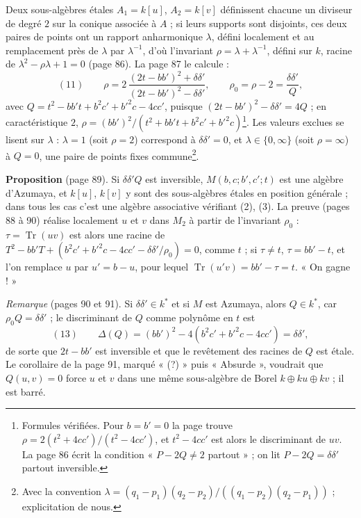 \documentclass[11pt,a4paper]{article}
\begin{document}
Deux sous-algèbres étales $A_1 = k[u]$, $A_2 = k[v]$ définissent chacune un
diviseur de degré $2$ sur la conique associée à $A$ ; si leurs supports sont
disjoints, ces deux paires de points ont un rapport anharmonique $\lambda$,
défini localement et au remplacement près de $\lambda$ par $\lambda^{-1}$, d'où
l'invariant $\rho = \lambda + \lambda^{-1}$, défini sur $k$, racine de
$\lambda^2 - \rho\lambda + 1 = 0$ (page 86). La page 87 le calcule :
\[
  (11)\qquad \rho = 2\,\frac{(2t - bb')^2 + \delta\delta'}{(2t - bb')^2 -
  \delta\delta'},\qquad
  \rho_0 = \rho - 2 = \frac{\delta\delta'}{Q},
\]
avec $Q = t^2 - bb't + b^2c' + b'^2c - 4cc'$, puisque $(2t - bb')^2 -
\delta\delta' = 4Q$ ; en caractéristique $2$, $\rho = (bb')^2/(t^2 + bb't + b^2c'
+ b'^2c)$\footnote{Formules vérifiées. Pour $b = b' = 0$ la page trouve $\rho =
2(t^2 + 4cc')/(t^2 - 4cc')$, et $t^2 - 4cc'$ est alors le discriminant de $uv$.
La page 86 écrit la condition « $P - 2Q \neq 2$ partout » ; on lit $P - 2Q =
\delta\delta'$ partout inversible.}. Les valeurs exclues se lisent sur
$\lambda$ : $\lambda = 1$ (soit $\rho = 2$) correspond à $\delta\delta' = 0$, et
$\lambda \in \{0, \infty\}$ (soit $\rho = \infty$) à $Q = 0$, une paire de points
fixes commune\footnote{Avec la convention $\lambda = (q_1 - p_1)(q_2 -
p_2)/((q_1 - p_2)(q_2 - p_1))$ ; explicitation de nous.}.

\textbf{Proposition} (page 89). Si $\delta\delta'Q$ est inversible, $M(b, c;
b', c'; t)$ est une algèbre d'Azumaya, et $k[u]$, $k[v]$ y sont des
sous-algèbres étales en position générale ; dans tous les cas c'est une algèbre
associative vérifiant (2), (3). La preuve (pages 88 à 90) réalise localement
$u$ et $v$ dans $M_2$ à partir de l'invariant $\rho_0$ : $\tau =
\operatorname{Tr}(uv)$ est alors une racine de $T^2 - bb'T + (b^2c' + b'^2c -
4cc' - \delta\delta'/\rho_0) = 0$, comme $t$ ; si $\tau \neq t$, $\tau = bb' - t$,
et l'on remplace $u$ par $u' = b - u$, pour lequel $\operatorname{Tr}(u'v) =
bb' - \tau = t$. « On gagne ! »

\emph{Remarque} (pages 90 et 91). Si $\delta\delta' \in k^{*}$ et si $M$ est
Azumaya, alors $Q \in k^{*}$, car $\rho_0 Q = \delta\delta'$ ; le discriminant de
$Q$ comme polynôme en $t$ est
\[
  (13)\qquad \Delta(Q) = (bb')^2 - 4(b^2c' + b'^2c - 4cc') = \delta\delta',
\]
de sorte que $2t - bb'$ est inversible et que le revêtement des racines de
$Q$ est étale. Le corollaire de la page 91, marqué « (?) » puis « Absurde »,
voudrait que $Q(u, v) = 0$ force $u$ et $v$ dans une même sous-algèbre de
Borel $k \oplus ku \oplus kv$ ; il est barré.
\end{document}
